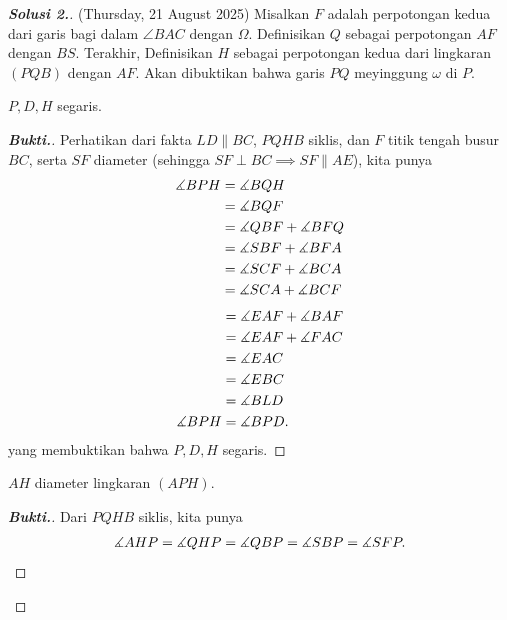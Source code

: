 \begin{proof}[\textbf{Solusi 2.}] (Thursday, 21 August 2025)
    Misalkan $F$ adalah perpotongan kedua dari garis bagi dalam $\angle BAC$ dengan $\Omega$. Definisikan $Q$ sebagai perpotongan $AF$ dengan $BS$. Terakhir, Definisikan $H$ sebagai perpotongan kedua dari lingkaran $(PQB)$ dengan $AF$. Akan dibuktikan bahwa garis $PQ$ meyinggung $\omega$ di $P$. 

    
    \begin{lemmarev}
        $P,D,H$ segaris. 
        \begin{proof}[\textbf{Bukti.}] Perhatikan dari fakta $LD \parallel BC$, $PQHB$ siklis, dan $F$ titik tengah busur $BC$, serta $SF$ diameter (sehingga $SF \perp BC \implies SF \parallel AE$), kita punya
            \begin{align*}
                \measuredangle BPH 
                &= \measuredangle BQH \\
                &= \measuredangle BQF \\
                &= \measuredangle QBF + \measuredangle BFQ \\
                &= \measuredangle SBF + \measuredangle BFA \\
                &= \measuredangle SCF + \measuredangle BCA \\
                &= \measuredangle SCA + \measuredangle BCF
            \end{align*}
            \begin{align*}
                &= \measuredangle EAF + \measuredangle BAF \\
                &= \measuredangle EAF + \measuredangle FAC \\
                &= \measuredangle EAC \\
                &= \measuredangle EBC \\
                &= \measuredangle BLD \\
               \measuredangle BPH  &= \measuredangle BPD.
            \end{align*}
            yang membuktikan bahwa $P,D,H$ segaris.
        \end{proof}
    \end{lemmarev}
    \begin{lemmarev}
        $AH$ diameter lingkaran $(APH)$.
        \begin{proof}[\textbf{Bukti.}] Dari $PQHB$ siklis, kita punya
            \begin{align*}
                \measuredangle AHP = \measuredangle QHP = \measuredangle QBP = \measuredangle SBP = \measuredangle SFP.
            \end{align*}

\end{proof}
\end{lemmarev}
\end{proof}
